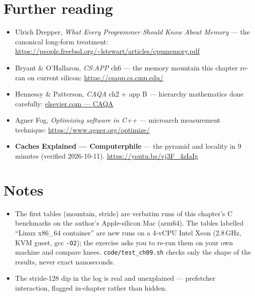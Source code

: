 \section*{Further reading}
\label{sec:further09}
\begin{itemize}
\item Ulrich Drepper, \emph{What Every Programmer Should Know About
      Memory} --- the canonical long-form treatment:
      \url{https://people.freebsd.org/~lstewart/articles/cpumemory.pdf}
\item Bryant \& O'Hallaron, \emph{CS:APP} ch6 --- the memory mountain
      this chapter re-ran on current silicon:
      \url{https://csapp.cs.cmu.edu/}
\item Hennessy \& Patterson, \emph{CAQA} ch2 + app B --- hierarchy
      mathematics done carefully:
      \href{https://www.elsevier.com/books/computer-architecture/hennessy/978-0-12-811905-1}{elsevier.com --- CAQA}
\item Agner Fog, \emph{Optimizing software in C++} --- microarch
      measurement technique:
      \url{https://www.agner.org/optimize/}
\end{itemize}

\begin{rulebox}
\begin{itemize}
\item \textbf{Caches Explained --- Computerphile} --- the pyramid
      and locality in 9 minutes (verified 2026-10-11).
      \url{https://youtu.be/vj3F_4zIaIg}
\end{itemize}
\end{rulebox}

\section*{Notes}
\label{sec:notes09}
\begin{itemize}
\item The first tables (mountain, stride) are verbatim runs of this
      chapter's C benchmarks on the author's Apple-silicon Mac (arm64).
      The tables labelled ``Linux x86\_64 container'' are new runs on a
      4-vCPU Intel Xeon (2.8\,GHz, KVM guest, gcc \texttt{-O2}); the
      exercise asks you to re-run them on your own machine and compare
      knees. \texttt{code/test\_ch09.sh} checks only the shape of the
      results, never exact nanoseconds.
\item The stride-128 dip in the log is real and unexplained ---
      prefetcher interaction, flagged in-chapter rather than hidden.
\end{itemize}

